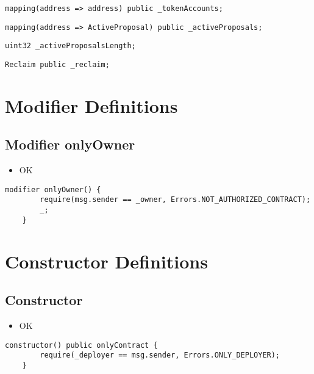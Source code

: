 \begin{lstlisting}[firstnumber=36]
    mapping(address => address) public _tokenAccounts;
\end{lstlisting}

\begin{lstlisting}[firstnumber=37]
    mapping(address => ActiveProposal) public _activeProposals;
\end{lstlisting}

\begin{lstlisting}[firstnumber=38]
    uint32 _activeProposalsLength;
\end{lstlisting}

\begin{lstlisting}[firstnumber=40]
    Reclaim public _reclaim;
\end{lstlisting}

\section{Modifier Definitions}


\subsection{Modifier onlyOwner}

\begin{itemize}
\item OK
\end{itemize}

\begin{lstlisting}[firstnumber=44]
    modifier onlyOwner() {
        require(msg.sender == _owner, Errors.NOT_AUTHORIZED_CONTRACT);
        _;
    }
\end{lstlisting}

\section{Constructor Definitions}


\subsection{Constructor}

\begin{itemize}
\item OK
\end{itemize}

\begin{lstlisting}[firstnumber=49]
    constructor() public onlyContract {
        require(_deployer == msg.sender, Errors.ONLY_DEPLOYER);
    }
\end{lstlisting}

